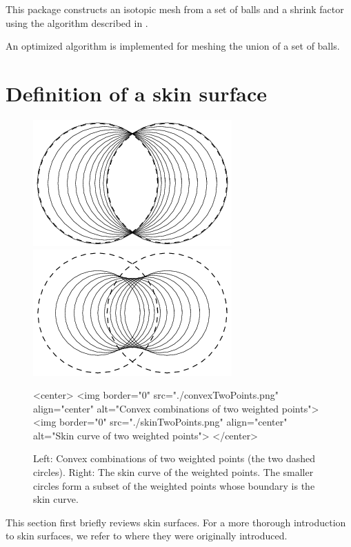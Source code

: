 This package constructs an isotopic mesh from a set of balls and a
shrink factor using the algorithm described in
\cite{cgal:kv-mssct-05}. %

An optimized algorithm is implemented for meshing the union of a set
of balls.

\section{Definition of a skin surface}
\label{sec:skindefinition}

\begin{figure}
  \begin{ccTexOnly}
    \begin{center}
      \includegraphics[width=.25\textwidth]{Skin_surface_3/convexTwoPoints}
      \includegraphics[width=.25\textwidth]{Skin_surface_3/skinTwoPoints}
    \end{center}
  \end{ccTexOnly}
  \begin{ccHtmlOnly}
    <center>
    <img border="0" src="./convexTwoPoints.png" align="center" alt="Convex combinations of two weighted points">
    <img border="0" src="./skinTwoPoints.png" align="center" alt="Skin
    curve of two weighted points">
    </center>
  \end{ccHtmlOnly}
  \caption{\label{fig:twoPoints} Left: Convex combinations of two
    weighted points (the two dashed circles). Right: The skin curve of
    the weighted points. The smaller circles form a subset of the
    weighted points whose boundary is the skin curve.}
\end{figure}

This section first briefly reviews skin surfaces. For a more thorough
introduction to skin surfaces, we refer to \cite{cgal:e-dssd-99} where
they were originally introduced.

